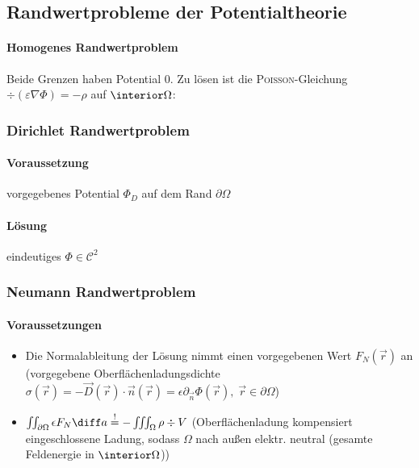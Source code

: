 \subsection{Randwertprobleme der Potentialtheorie}
\begin{sectionbox}
      \paragraph{Homogenes Randwertproblem} Beide Grenzen haben Potential 0.
      Zu lösen ist die \textsc{Poisson}-Gleichung $\div(\varepsilon \nabla \Phi) = -\rho$ auf $\interior \Omega$:\\

      \subsubsection{Dirichlet Randwertproblem}
      \paragraph{Voraussetzung} vorgegebenes Potential $\Phi_D$ auf dem Rand $\partial\Omega$
      \begin{center}
            \paragraph{Lösung} eindeutiges $\Phi \in \mathcal C^2$
      \end{center}

      \vspace{2mm}
      \subsubsection{Neumann Randwertproblem}
      \paragraph{Voraussetzungen} \begin{itemize}
            \item Die Normalableitung der Lösung nimmt einen vorgegebenen Wert $F_N(\vec r)$ an (vorgegebene Oberflächenladungsdichte $\sigma(\vec r) = -\vec D(\vec r)\cdot \vec n(\vec r) = \epsilon\partial_{\vec n}\Phi(\vec r), \; \vec r \in \partial\Omega$)
            \item $\iint_{\partial\Omega}\epsilon F_N\diff a \overset{!}{=} -\iiint_{\Omega}\rho\div V$ (Oberflächenladung kompensiert eingeschlossene Ladung, sodass $\Omega$ nach außen elektr. neutral (gesamte Feldenergie in $\interior\Omega$))
      \end{itemize}
      \begin{center}

\end{center}
\end{sectionbox}

